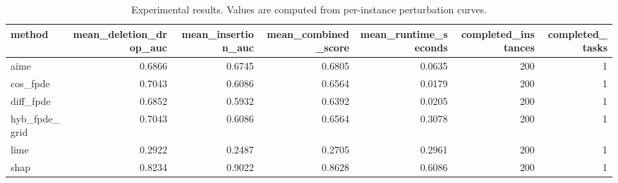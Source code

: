\begin{table}[t]
\caption{Experimental results. Values are computed from per-instance perturbation curves.}
\label{tab:main_results_computed}
\centering
\begin{tabular}{lrrrrrr}
\toprule
method & mean\_deletion\_drop\_auc & mean\_insertion\_auc & mean\_combined\_score & mean\_runtime\_seconds & completed\_instances & completed\_tasks \\
\midrule
aime & 0.6866 & 0.6745 & 0.6805 & 0.0635 & 200 & 1 \\
cos\_fpde & 0.7043 & 0.6086 & 0.6564 & 0.0179 & 200 & 1 \\
diff\_fpde & 0.6852 & 0.5932 & 0.6392 & 0.0205 & 200 & 1 \\
hyb\_fpde\_grid & 0.7043 & 0.6086 & 0.6564 & 0.3078 & 200 & 1 \\
lime & 0.2922 & 0.2487 & 0.2705 & 0.2961 & 200 & 1 \\
shap & 0.8234 & 0.9022 & 0.8628 & 0.6086 & 200 & 1 \\
\bottomrule
\end{tabular}

\end{table}
